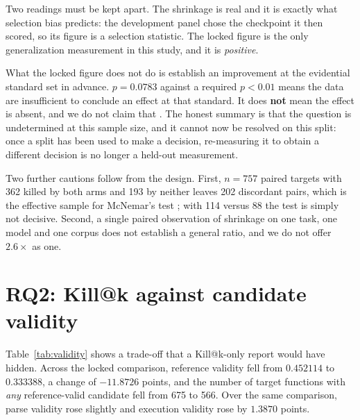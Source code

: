 \documentclass[10pt,conference]{IEEEtran}
\makeatletter
\newcommand{\killk}[1]{Kill@#1}
\makeatother
\begin{document}
Two readings must be kept apart. The shrinkage is real and it is exactly what
selection bias predicts: the development panel chose the checkpoint it then
scored, so its figure is a selection statistic. The locked figure is the only
generalization measurement in this study, and it is \emph{positive}.

What the locked figure does not do is establish an improvement at the evidential
standard set in advance. $p = 0.0783$ against a required $p < 0.01$ means the
data are insufficient to conclude an effect at that standard. It does
\textbf{not} mean the effect is absent, and we do not claim that
\cite{wasserstein2016asa,amrhein2019retire}. The honest summary is that the
question is undetermined at this sample size, and it cannot now be resolved on
this split: once a split has been used to make a decision, re-measuring it to
obtain a different decision is no longer a held-out measurement.

Two further cautions follow from the design. First, $n = 757$ paired targets
with 362 killed by both arms and 193 by neither leaves 202 discordant pairs,
which is the effective sample for McNemar's test \cite{mcnemar1947note}; with
114 versus 88 the test is simply not decisive. Second, a single paired
observation of shrinkage on one task, one model and one corpus does not
establish a general ratio, and we do not offer $2.6\times$ as one.

\section{RQ2: \killk{k} against candidate validity}
\label{sec:rq2}

Table~\ref{tab:validity} shows a trade-off that a \killk{k}-only report would
have hidden. Across the locked comparison, reference validity fell from
$0.452114$ to $0.333388$, a change of $-11.8726$ points, and the number of
target functions with \emph{any} reference-valid candidate fell from 675 to 566.
Over the same comparison, parse validity rose slightly and execution validity
rose by $1.3870$ points.
\end{document}
